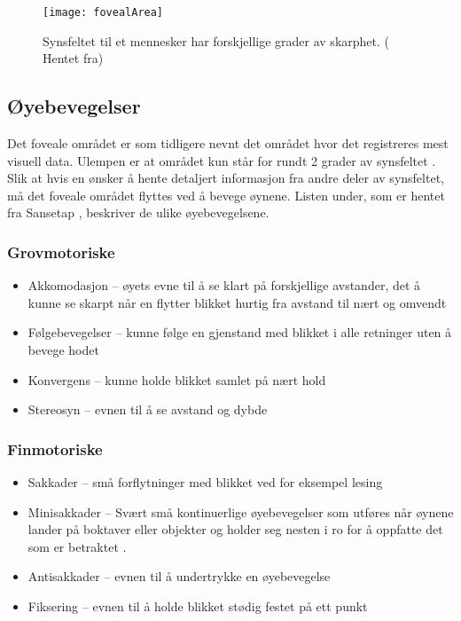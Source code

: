 \begin{figure}[ht!]
\centering
\texttt{[image: fovealArea]}
\caption{Synsfeltet til et mennesker har forskjellige grader av skarphet. ( Hentet fra\cite{VisualImage})}
\label{fig:visueltArea}
\end{figure}

\subsection{Øyebevegelser}

Det foveale området er som tidligere nevnt det området hvor det registreres mest visuell data. Ulempen er at området kun står for rundt 2 grader av synsfeltet \cite{Backg0:online}. Slik at hvis en ønsker å hente detaljert informasjon fra andre deler av synsfeltet, må det foveale området flyttes ved å bevege øynene. Listen under, som er hentet fra Sansetap \cite{sanse7:online}, beskriver de ulike øyebevegelsene.


\subsubsection{Grovmotoriske}
\begin{itemize}
\item Akkomodasjon – øyets evne til å se klart på forskjellige avstander, det å kunne se skarpt når en flytter blikket hurtig fra avstand til nært og omvendt
\item Følgebevegelser – kunne følge en gjenstand med blikket i alle retninger uten å bevege hodet
\item Konvergens – kunne holde blikket samlet på nært hold
\item Stereosyn – evnen til å se avstand og dybde
\end{itemize}
\subsubsection{Finmotoriske}
\begin{itemize}
\item Sakkader – små forflytninger med blikket ved for eksempel lesing
\item Minisakkader –  Svært små kontinuerlige øyebevegelser som utføres når øynene lander på boktaver eller objekter og holder seg nesten i ro for å oppfatte det som er betraktet \cite{Willy}.
\item Antisakkader – evnen til å undertrykke en øyebevegelse
\item Fiksering – evnen til å holde blikket stødig festet på ett punkt
\end{itemize}




